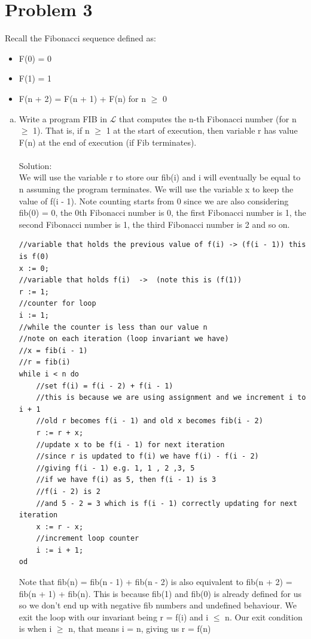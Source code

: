 \documentclass{article}
\newcommand*\moveToRight[1]{\hspace*{0em plus 1fill}\makebox{(#1)}}
\begin{document}
\newpage
\section{Problem 3}
Recall the Fibonacci sequence defined as:
\begin{itemize}
    \item F(0) = 0
    \item F(1) = 1
    \item F(n + 2) = F(n + 1) + F(n) for n $\geq$ 0
\end{itemize}
    \begin{enumerate}[(a)]
        \item Write a program FIB in $\mathcal{L}$ that computes the n-th Fibonacci number (for n $\geq$ 1). That is, if n $\geq$ 1 at the start of execution, then variable r has value F(n) at the end of execution (if Fib terminates). \moveToRight{12 marks}\\\\
        Solution:\\
        We will use the variable r to store our fib(i) and i will eventually be equal to n assuming the program terminates. We will use the variable x to keep the value of f(i - 1). Note counting starts from 0 since we are also considering fib(0) = 0, the 0th Fibonacci number is 0, the first Fibonacci number is 1, the second Fibonacci number is 1, the third Fibonacci number is 2 and so on.
    \begin{lstlisting}[language=Maple,mathescape=true]
//variable that holds the previous value of f(i) -> (f(i - 1)) this is f(0)
x := 0;
//variable that holds f(i)  ->  (note this is (f(1))
r := 1;
//counter for loop
i := 1;
//while the counter is less than our value n
//note on each iteration (loop invariant we have)
//x = fib(i - 1)
//r = fib(i)
while i < n do
    //set f(i) = f(i - 2) + f(i - 1)
    //this is because we are using assignment and we increment i to i + 1
    //old r becomes f(i - 1) and old x becomes fib(i - 2)
    r := r + x;
    //update x to be f(i - 1) for next iteration
    //since r is updated to f(i) we have f(i) - f(i - 2)
    //giving f(i - 1) e.g. 1, 1 , 2 ,3, 5
    //if we have f(i) as 5, then f(i - 1) is 3
    //f(i - 2) is 2
    //and 5 - 2 = 3 which is f(i - 1) correctly updating for next iteration
    x := r - x;
    //increment loop counter
    i := i + 1;
od
    \end{lstlisting}
    Note that fib(n) = fib(n - 1) + fib(n - 2) is also equivalent to fib(n + 2) = fib(n + 1) + fib(n). This is because fib(1) and fib(0) is already defined for us so we don't end up with negative fib numbers and undefined behaviour. We exit the loop with our invariant being r = f(i) and i $\leq$ n. Our exit condition is when i $\geq$ n, that means i = n, giving us r = f(n)\\
    

\end{enumerate}
\end{document}
